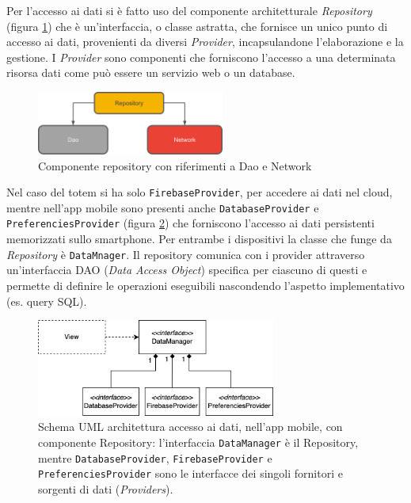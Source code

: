 Per l'accesso ai dati si è fatto uso del componente architetturale \textit{Repository} \cite{repositoryComponent} (figura \ref{fig:repository}) che è un'interfaccia, o classe astratta, che fornisce un unico punto di accesso ai dati, provenienti da diversi \textit{Provider}, incapsulandone l'elaborazione e la gestione. I \textit{Provider} sono componenti che forniscono l'accesso a una determinata risorsa dati come può essere un servizio web o un database.
\begin{figure}[h]
    \centering
    \includegraphics[width=0.55\textwidth]{img/repository.png}
    \caption{Componente repository con riferimenti a Dao e Network \cite{repositoryComponent}}
    \label{fig:repository}
\end{figure}
Nel caso del totem si ha solo \texttt{FirebaseProvider}, per accedere ai dati nel cloud, mentre nell'app mobile sono presenti anche \texttt{DatabaseProvider} e \texttt{PreferenciesProvider} (figura \ref{fig:repositorySchemaAPP}) che forniscono l'accesso ai dati persistenti memorizzati sullo smartphone. Per entrambe i dispositivi la classe che funge da \textit{Repository} è \texttt{DataMnager}.
Il repository comunica con i provider attraverso un'interfaccia DAO (\textit{Data Access Object}) specifica per ciascuno di questi e permette di definire le operazioni eseguibili nascondendo l'aspetto implementativo (es. query SQL).
\begin{figure}[h]
    \centering
    \includegraphics[width=0.7\textwidth]{img/app/repository_pattern_scheme.png}
    \caption{Schema UML architettura accesso ai dati, nell'app mobile, con componente Repository: l'interfaccia \texttt{DataManager} è il Repository, mentre \texttt{DatabaseProvider}, \texttt{FirebaseProvider} e \texttt{PreferenciesProvider} sono le interfacce dei singoli fornitori e sorgenti di dati (\textit{Providers}).}
    \label{fig:repositorySchemaAPP}
\end{figure}
\newpage
